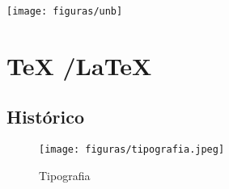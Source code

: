 




    \texttt{[image: figuras/unb]}


% 


\section {\TeX{} /\LaTeX{}}
\subsection*{Histórico}
\begin{frame}
\begin{figure}[htbp]
    \centering
        \texttt{[image: figuras/tipografia.jpeg]}
    \caption{Tipografia}
    \label{fig:tipografia}
\end{figure}
\end{frame}

